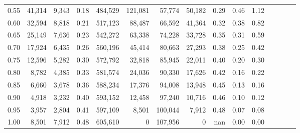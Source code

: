 \begin{tabular}{rrrcrrrrrrrrrrr}
0.55 &  41,314 &  9,343 &                                       0.18 &  484,529 &  121,081 &   57,774 &   50,182 &  0.29 &  0.46 &                         1.12 \\
0.60 &  32,594 &  8,818 &                                       0.21 &  517,123 &   88,487 &   66,592 &   41,364 &  0.32 &  0.38 &                         0.82 \\
0.65 &  25,149 &  7,636 &                                       0.23 &  542,272 &   63,338 &   74,228 &   33,728 &  0.35 &  0.31 &                         0.59 \\
0.70 &  17,924 &  6,435 &                                       0.26 &  560,196 &   45,414 &   80,663 &   27,293 &  0.38 &  0.25 &                         0.42 \\
0.75 &  12,596 &  5,282 &                                       0.30 &  572,792 &   32,818 &   85,945 &   22,011 &  0.40 &  0.20 &                         0.30 \\
0.80 &   8,782 &  4,385 &                                       0.33 &  581,574 &   24,036 &   90,330 &   17,626 &  0.42 &  0.16 &                         0.22 \\
0.85 &   6,660 &  3,678 &                                       0.36 &  588,234 &   17,376 &   94,008 &   13,948 &  0.45 &  0.13 &                         0.16 \\
0.90 &   4,918 &  3,232 &                                       0.40 &  593,152 &   12,458 &   97,240 &   10,716 &  0.46 &  0.10 &                         0.12 \\
0.95 &   3,957 &  2,804 &                                       0.41 &  597,109 &    8,501 &  100,044 &    7,912 &  0.48 &  0.07 &                         0.08 \\
1.00 &   8,501 &  7,912 &                                       0.48 &  605,610 &        0 &  107,956 &        0 &   nan &  0.00 &                         0.00 \\
\bottomrule
\end{tabular}
